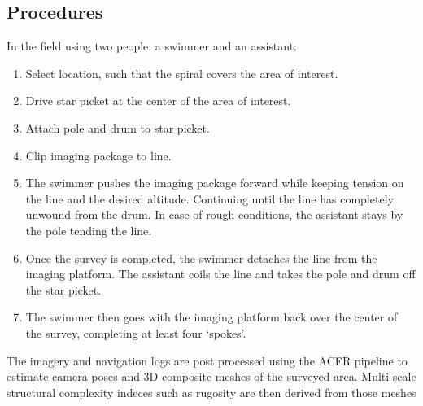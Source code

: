 \subsection{Procedures}

In the field using two people: a swimmer and an assistant:\begin{enumerate}
\item Select location, such that the spiral covers the area of interest.
\item Drive star picket at the center of the area of interest. 
\item Attach pole and drum to star picket.
\item Clip imaging package to line.
\item The swimmer pushes the imaging package forward while keeping tension on the line and the desired altitude. Continuing until the line has completely unwound from the drum. In case of rough conditions, the assistant stays by the pole tending the line.
\item Once the survey is completed, the swimmer detaches the line from the imaging platform. The assistant coils the line and takes the pole and drum off the star picket. 
\item The swimmer then goes with the imaging platform back over the center of the survey, completing at least four `spokes'.  
\end{enumerate}

The imagery and navigation logs are post processed using the ACFR pipeline \cite{Johnson_Roberson_2010} \cite{Mahon_2008} \cite{Johnson_Roberson_2013} to estimate camera poses and 3D composite meshes of the surveyed area. Multi-scale structural complexity indeces such as rugosity are then derived from those meshes \cite{Friedman_2012} 
